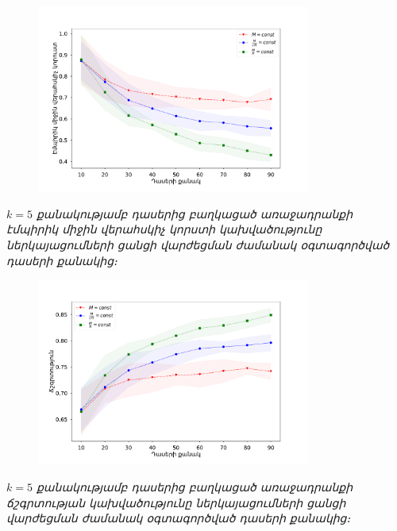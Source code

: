 \documentclass[10pt]{beamer}
\begin{document}
\begin{frame}
\begin{figure}[htp]
\centering
\includegraphics[width=0.8\textwidth]{imgs/k=5.pdf}
\end{figure}
\begin{center}
 \fontsize{7pt}{7pt} 
\armfont \textit{$k=5$ քանակությամբ դասերից բաղկացած առաջադրանքի էմպիրիկ միջին վերահսկիչ կորստի կախվածությունը ներկայացումների ցանցի վարժեցման ժամանակ  օգտագործված դասերի քանակից։}
\end{center}
\end{frame}


\begin{frame}
\begin{figure}[htp]
\centering
\includegraphics[width=0.8\textwidth]{imgs/k=5_acc.pdf}
\end{figure}
\begin{center}
 \fontsize{7pt}{7pt} 
\armfont \textit{$k=5$ քանակությամբ դասերից բաղկացած առաջադրանքի ճշգրտության կախվածությունը ներկայացումների ցանցի վարժեցման ժամանակ  օգտագործված դասերի քանակից։}
\end{center}
\end{frame}
\end{document}
